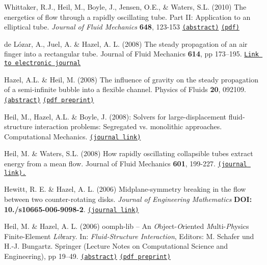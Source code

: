 \begin{DoxyItemize}
\item Whittaker, R.\+J., Heil, M., Boyle, J., Jensen, O.\+E., \& Waters, S.\+L. (2010) The energetics of flow through a rapidly oscillating tube. Part II\+: Application to an elliptical tube. {\itshape Journal of Fluid Mechanics} {\bfseries 648}, 123-\/153 \href{http://www.maths.man.ac.uk/~mheil/MATTHIAS/ABSTRACTS/WhittakerEtAlPart2_2008.html}{\tt (abstract)} \href{http://www.maths.man.ac.uk/~mheil/MATTHIAS/PDF/WhittakerEtAlPart2.pdf}{\tt (pdf)}
\item de L\'{o}zar, A., Juel, A. \& Hazel, A. L. (2008) The steady propagation of an air finger into a rectangular tube. Journal of Fluid Mechanics {\bfseries  614}, pp 173--195. \href{http://journals.cambridge.org/action/displayAbstract?fromPage=online&aid=2459772&fulltextType=RA&fileId=S0022112008003455}{\tt Link to electronic journal}
\item Hazel, A.\+L. \& Heil, M. (2008) The influence of gravity on the steady propagation of a semi-\/infinite bubble into a flexible channel. Physics of Fluids {\bfseries 20}, 092109. \href{http://www.maths.man.ac.uk/~mheil/MATTHIAS/ABSTRACTS/HazelHeilPoF2007.html}{\tt (abstract)} \href{http://www.maths.man.ac.uk/~mheil/MATTHIAS/PDF/HazelHeilPoF2008.pdf}{\tt (pdf preprint)}
\item Heil, M., Hazel, A.\+L. \& Boyle, J. (2008)\+: Solvers for large-\/displacement fluid-\/structure interaction problems\+: Segregated vs. monolithic approaches. Computational Mechanics. \href{http://www.springerlink.com/content/m3r6318701g338g4/}{\tt (journal link)}
\item Heil, M. \& Waters, S.\+L. (2008) How rapidly oscillating collapsible tubes extract energy from a mean flow. Journal of Fluid Mechanics {\bfseries 601}, 199-\/227. \href{http://journals.cambridge.org/action/displayFulltext?type=1&fid=1846472&jid=FLM&volumeId=601&issueId=-1&aid=1846464}{\tt (journal link).}
\item Hewitt, R. E. \& Hazel, A. L. (2006) Midplane-\/symmetry breaking in the flow between two counter-\/rotating disks. {\itshape Journal of Engineering Mathematics} {\bfseries D\+OI\+: 10./s10665-\/006-\/9098-\/2}. \href{http://www.springerlink.com/content/8930128433612244/}{\tt (journal link)}
\item Heil, M. \& Hazel, A. L. (2006) {\ttfamily oomph-\/lib} -- An {\itshape O}bject-\/{\itshape O}riented {\itshape M}ulti-\/{\itshape Ph}ysics Finite-\/\+Element {\itshape Lib}rary. In\+: {\itshape Fluid-\/\+Structure Interaction}, Editors\+: M. Schafer und H.-\/J. Bungartz. Springer (Lecture Notes on Computational Science and Engineering), pp 19--49. \href{http://www.maths.man.ac.uk/~mheil/MATTHIAS/ABSTRACTS/HeilHazelOomph2006.html}{\tt (abstract)} \href{http://www.maths.man.ac.uk/~mheil/MATTHIAS/PDF/oomph_for_www.pdf}{\tt (pdf preprint)}

\end{DoxyItemize}
